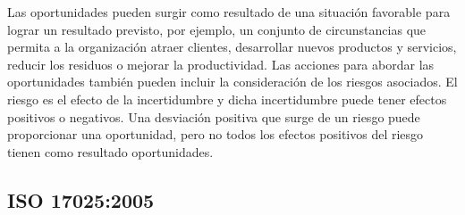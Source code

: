 				\par \noindent
					Las oportunidades pueden surgir como resultado de una situación favorable para lograr un resultado
					previsto, por ejemplo, un conjunto de circunstancias que permita a la organización atraer clientes,
					desarrollar nuevos productos y servicios, reducir los residuos o mejorar la productividad. Las acciones
					para abordar las oportunidades también pueden incluir la consideración de los riesgos asociados. El
					riesgo es el efecto de la incertidumbre y dicha incertidumbre puede tener efectos positivos o negativos. Una desviación positiva que surge de un riesgo puede proporcionar una oportunidad, pero no todos los efectos positivos del riesgo tienen como resultado oportunidades.
					
		\subsection{ISO 17025:2005}
				
				

			
			
				
				